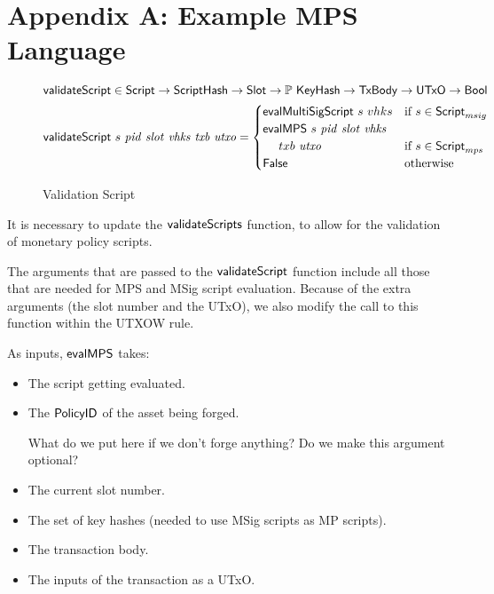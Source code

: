 \section*{Appendix A: Example MPS Language}
\label{sec:mps-lang}


\begin{figure}[htb]
  \begin{align*}
    \mathsf{validateScript} & \in\mathsf{Script}\to\mathsf{ScriptHash}\to\mathsf{Slot}\to
    \mathbb{P}~\mathsf{KeyHash}\to\mathsf{TxBody}\to\mathsf{UTxO}\to\mathsf{Bool} \\
    \mathsf{validateScript} & ~s~\mathit{pid}~\mathit{slot}~\mathit{vhks}
     ~\mathit{txb}~\mathit{utxo} =
                           \begin{cases}
                             \mathsf{evalMultiSigScript}~s~vhks & \text{if}~s \in\mathsf{Script}_{msig} \\
                             \mathsf{evalMPS}~s~\mathit{pid}~\mathit{slot}~\mathit{vhks} \\
                              ~~~~txb~\mathit{utxo} & \text{if}~s \in\mathsf{Script}_{mps} \\
                             \mathsf{False} & \text{otherwise}
                           \end{cases}
  \end{align*}
  \caption{Validation Script}
  \label{fig:functions-validate}
\end{figure}

It is necessary to update the
$\mathsf{validateScripts}$ function, to allow for the validation of
monetary policy scripts.

The arguments that are passed to the $\mathsf{validateScript}$ function include all those
that are needed for MPS and MSig script evaluation. Because of the extra arguments
(the slot number and the UTxO), we also modify the call to this function
within the UTXOW rule.

As inputs, $\mathsf{evalMPS}$ takes:

\begin{itemize}
\item The script getting evaluated.
\item The $\mathsf{PolicyID}$ of the asset being forged.
  \begin{note}
    What do we put here if we don't forge anything? Do we make this argument optional?
  \end{note}
\item The current slot number.
\item The set of key hashes (needed to use MSig scripts as MP scripts).
\item The transaction body.
\item The inputs of the transaction as a UTxO.
\end{itemize}

